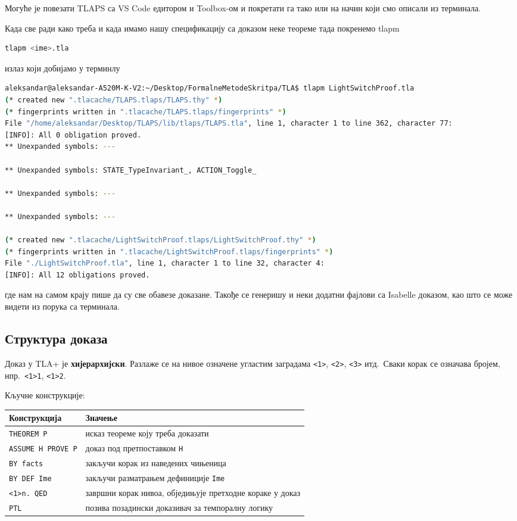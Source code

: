 Могуће је повезати TLAPS са VS Code едитором и Toolbox-ом и покретати га тако или на начин који смо описали из терминала.

Када све ради како треба и када имамо нашу спецификацију са доказом неке теореме тада покренемо tlapm 
\begin{lstlisting}[language=bash]
tlapm <ime>.tla
\end{lstlisting}
излаз који добијамо у терминлу
\begin{lstlisting}[language=bash]
aleksandar@aleksandar-A520M-K-V2:~/Desktop/FormalneMetodeSkritpa/TLA$ tlapm LightSwitchProof.tla 
(* created new ".tlacache/TLAPS.tlaps/TLAPS.thy" *)
(* fingerprints written in ".tlacache/TLAPS.tlaps/fingerprints" *)
File "/home/aleksandar/Desktop/TLAPS/lib/tlaps/TLAPS.tla", line 1, character 1 to line 362, character 77:
[INFO]: All 0 obligation proved.
** Unexpanded symbols: ---

** Unexpanded symbols: STATE_TypeInvariant_, ACTION_Toggle_

** Unexpanded symbols: ---

** Unexpanded symbols: ---

(* created new ".tlacache/LightSwitchProof.tlaps/LightSwitchProof.thy" *)
(* fingerprints written in ".tlacache/LightSwitchProof.tlaps/fingerprints" *)
File "./LightSwitchProof.tla", line 1, character 1 to line 32, character 4:
[INFO]: All 12 obligations proved.
\end{lstlisting}
где нам на самом крају пише да су све обавезе доказане. Такође се генеришу и неки додатни фајлови са Isabelle доказом,
као што се може видети из порука са терминала.
\subsection{Структура доказа}

Доказ у TLA+ је \textbf{хијерархијски}. Разлаже се на нивое означене угластим заградама
\texttt{<1>}, \texttt{<2>}, \texttt{<3>} итд.\ Сваки корак се означава бројем, нпр.\ \texttt{<1>1}, \texttt{<1>2}.

Кључне конструкције:

\begin{center}
\begin{tabularx}{\textwidth}{|l|X|}
\hline
\textbf{Конструкција} & \textbf{Значење} \\
\hline
\texttt{THEOREM P} & исказ теореме коју треба доказати \\
\texttt{ASSUME H PROVE P} & доказ под претпоставком \texttt{H} \\
\texttt{BY facts} & закључи корак из наведених чињеница \\
\texttt{BY DEF Ime} & закључи разматрањем дефиниције \texttt{Ime} \\
\texttt{<1>n. QED} & завршни корак нивоа, обједињује претходне кораке у доказ\\
\texttt{PTL} & позива позадински доказивач за темпоралну логику \\
\hline
\end{tabularx}
\end{center}


